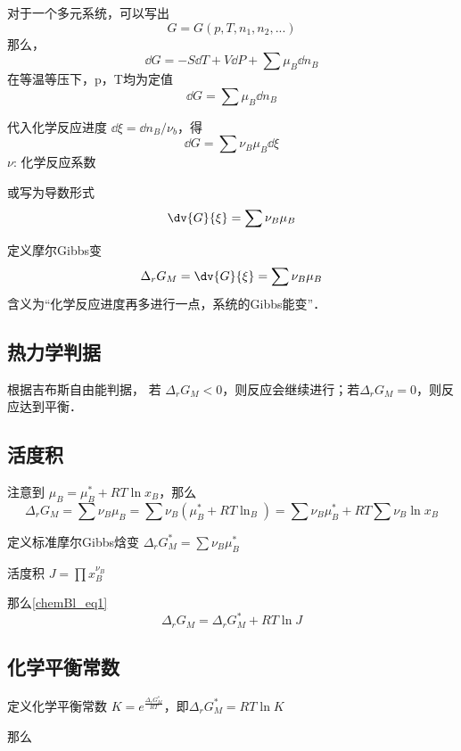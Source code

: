 
\begin{issues}
\issueDraft
\end{issues}


对于一个多元系统，可以写出
\begin{equation}
G=G(p,T,n_1,n_2,...)
\end{equation}
那么，
\begin{equation}
\dd G=-S \dd T +V \dd P + \sum \mu_B \dd n_B
\end{equation}
在等温等压下，p，T均为定值
\begin{equation}
\dd G=\sum \mu_B \dd n_B
\end{equation}

代入化学反应进度 $\dd \xi=\dd n_B/\nu_b$，得
\begin{equation}
\dd G=\sum \nu_B \mu_B \dd \xi
\end{equation}
$\nu$: 化学反应系数

或写为导数形式
\begin{equation}
\dv{G}{\xi}=\sum \nu_B \mu_B
\end{equation}

定义摩尔Gibbs变
\begin{equation}
\Delta _r G_M = \dv{G}{\xi}=\sum \nu_B \mu_B
\end{equation}
含义为“化学反应进度再多进行一点，系统的Gibbs能变”．

\subsection{热力学判据}
根据吉布斯自由能判据，
若 $\Delta _r G_M<0$，则反应会继续进行；若$\Delta _r G_M = 0$，则反应达到平衡．

\subsection{活度积}
注意到 
$\mu_B=\mu_B^*+RT \ln x_B$，那么
\begin{equation} \label{chemBl_eq1}
\Delta _r G_M =\sum \nu_B \mu_B = \sum \nu_B (\mu_B^*+RT\ln _B)=\sum \nu_B \mu_B^* + RT \sum \nu_B \ln x_B
\end{equation}

定义标准摩尔Gibbs焓变 $\Delta _r G_M^*=\sum \nu_B \mu_B^*$

活度积 $J=\prod x_B^{\nu_B}$

那么\autoref{chemBl_eq1} 
\begin{equation}
\Delta _r G_M = \Delta _r G_M^* + RT \ln J
\end{equation}

\subsection{化学平衡常数}
定义化学平衡常数 $K = e^{\frac{\Delta _r G_M^*}{RT}}$，即$\Delta _r G_M^* = RT \ln K$

那么 